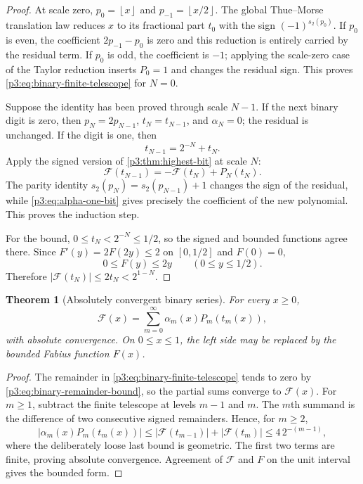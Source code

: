 \documentclass[11pt]{article}
\numberwithin{equation}{section}
\newtheorem{theorem}{Theorem}[section]
\theoremstyle{definition}
\theoremstyle{remark}
\newcommand{\GF}{\mathcal F}
\newcommand{\floor}[1]{\left\lfloor#1\right\rfloor}
\begin{document}
\begin{proof}
At scale zero, $p_0=\floor{x}$ and $p_{-1}=\floor{x/2}$.  The global
Thue--Morse translation law reduces $x$ to its fractional part $t_0$ with the
sign $(-1)^{s_2(p_0)}$.  If $p_0$ is even, the coefficient
$2p_{-1}-p_0$ is zero and this reduction is entirely carried by the residual
term.  If $p_0$ is odd, the coefficient is $-1$; applying the scale-zero case
of the Taylor reduction inserts $P_0=1$ and changes the residual sign.  This
proves \eqref{p3:eq:binary-finite-telescope} for $N=0$.

Suppose the identity has been proved through scale $N-1$.  If the next binary
digit is zero, then $p_N=2p_{N-1}$, $t_N=t_{N-1}$, and
$\alpha_N=0$; the residual is unchanged.  If the digit is one, then
\begin{equation}\label{p3:eq:binary-tail-step}
 t_{N-1}=2^{-N}+t_N.
\end{equation}
Apply the signed version of \cref{p3:thm:highest-bit} at scale $N$:
\begin{equation}\label{p3:eq:binary-reduction-step}
 \GF(t_{N-1})=-\GF(t_N)+P_N(t_N).
\end{equation}
The parity identity
$s_2(p_N)=s_2(p_{N-1})+1$ changes the sign of the residual, while
\eqref{p3:eq:alpha-one-bit} gives precisely the coefficient of the new
polynomial.  This proves the induction step.

For the bound, $0\le t_N<2^{-N}\le1/2$, so the signed and bounded functions
agree there.  Since $F'(y)=2F(2y)\le2$ on $[0,1/2]$ and $F(0)=0$,
\begin{equation}\label{p3:eq:F-linear-tail-bound}
 0\le F(y)\le2y\qquad(0\le y\le1/2).
\end{equation}
Therefore $|\GF(t_N)|\le2t_N<2^{1-N}$.
\end{proof}

\begin{theorem}[Absolutely convergent binary series]\label{p3:thm:binary-series}
For every $x\ge0$,
\begin{equation}\label{p3:eq:binary-series}
\boxed{
 \GF(x)=\sum_{m=0}^{\infty}\alpha_m(x)P_m(t_m(x)),}
\end{equation}
with absolute convergence.  On $0\le x\le1$, the left side may be replaced
by the bounded Fabius function $F(x)$.
\end{theorem}

\begin{proof}
The remainder in \eqref{p3:eq:binary-finite-telescope} tends to zero by
\eqref{p3:eq:binary-remainder-bound}, so the partial sums converge to $\GF(x)$.
For $m\ge1$, subtract the finite telescope at levels $m-1$ and $m$.  The
$m$th summand is the difference of two consecutive signed remainders.  Hence,
for $m\ge2$,
\begin{equation}\label{p3:eq:binary-summand-bound}
 |\alpha_m(x)P_m(t_m(x))|
 \le |\GF(t_{m-1})|+|\GF(t_m)|
 \le 4\,2^{-(m-1)},
\end{equation}
where the deliberately loose last bound is geometric.  The first two terms
are finite, proving absolute convergence.  Agreement of $\GF$ and $F$ on the
unit interval gives the bounded form.
\end{proof}
\end{document}
